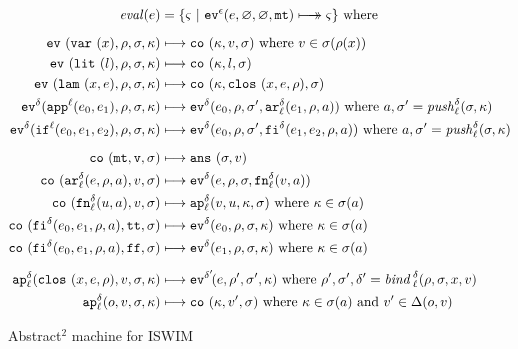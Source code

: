 \documentclass[preprint,onecolumn,9pt]{sigplanconf} %
\begin{document}
\begin{figure}
\begin{align*}
\mathit{eval}(\mexp) &= \{ \mstate\ |\ \ev[^{\mtcntr}]{\mexp,\varnothing,\varnothing,\kmt} \multimachstep \mstate \} \text{ where }
\\[2mm]
\ev{\svar\mvar,\menv,\msto,\mkont} &\machstep
\co{\mkont,\mval,\msto}
\text{ where }\mval \in \msto(\menv(\mvar))
\\
\ev{\slit\mlit,\menv,\msto,\mkont} &\machstep
\co{\mkont,\mlit,\msto}
\\
\ev{\slam\mvar\mexp,\menv,\msto,\mkont} &\machstep
\co{\mkont,\clos{\mvar,\mexp,\menv},\msto}
\\
\ev[^\mcntr]{\sapp[^\mlab]{\mexpi0}{\mexpi1},\menv,\msto,\mkont} &\machstep
\ev[^\mcntr]{\mexpi{0},\menv,\msto',\kar[_\mlab^\mcntr]{\mexpi{1},\menv,\maddr}}
\text{ where }\maddr,\msto' = \mathit{push}^\mcntr_\mlab(\msto,\mkont)
\\
\ev[^\mcntr]{\sif[^\mlab]{\mexpi0}{\mexpi1}{\mexpi2},\menv,\msto,\mkont} &\machstep
\ev[^\mcntr]{\mexpi0,\menv,\msto',\kif[^\mcntr]{\mexpi1,\mexpi2,\menv,\maddr}}
\text{ where }\maddr,\msto' = \mathit{push}_\mlab^\mcntr(\msto,\mkont)
\\[2mm]
\co{\kmt,\mval,\msto} &\machstep
\ans{\msto,\mval}
\\
\co{\kar[^\mcntr_\mlab]{\mexp,\menv,\maddr},\mval,\msto} & \machstep
\ev[^\mcntr]{\mexp,\menv,\msto,\kfn[^\mcntr_\mlab]{\mval,\maddr}}
\\
\co{\kfn[^\mcntr_\mlab]{{\mvalx{u}},\maddr},\mval,\msto} & \machstep
\ap[^\mcntr_\mlab]{\mval,\mvalx{u},\mkont,\msto}
\text{ where }\mkont \in \msto(\maddr)
\\
\co{\kif[^\mcntr]{\mexpi0,\mexpi1,\menv,\maddr},\strue,\msto} & \machstep
\ev[^\mcntr]{\mexpi0,\menv,\msto,\mkont}
\text{ where }\mkont\in\msto(\maddr)
\\
\co{\kif[^\mcntr]{\mexpi0,\mexpi1,\menv,\maddr},\sfalse,\msto} & \machstep
\ev[^\mcntr]{\mexpi1,\menv,\msto,\mkont}
\text{ where }\mkont\in\msto(\maddr)
\\[2mm]
\ap[^\mcntr_\mlab]{\clos{\mvar,\mexp,\menv},\mval,\msto,\mkont} & \machstep
\ev[^{\mcntr'}\!]{\mexp,\menv',\msto',\mkont}
\text{ where }\menv',\msto',\mcntr' = \mathit{bind\,}^{ \mcntr}_\mlab(\menv,\msto,\mvar,\mval)
\\
\ap[^\mcntr_\mlab]{\mop,\mval,\msto,\mkont} & \machstep
\co{\mkont,\mval',\msto}
\text{ where }\mkont\in\msto(\maddr)
\text{ and } \mval'\in\interpdelta(\mop,\mval)
\end{align*}
\caption{Abstract$^2$ machine for ISWIM}
\label{fig:aam}
\end{figure}
\end{document}
